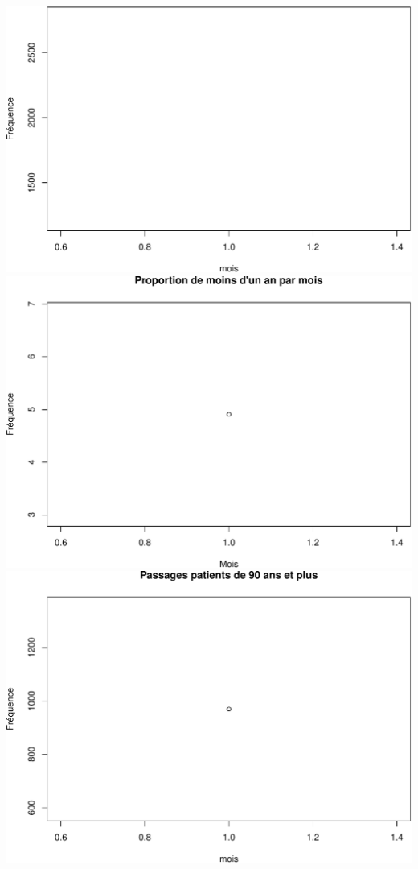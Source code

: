 \documentclass[]{article}
\begin{document}
\includegraphics{rapport_2014_files/figure-latex/age_extreme-1.pdf}
\includegraphics{rapport_2014_files/figure-latex/age_extreme-2.pdf}
\includegraphics{rapport_2014_files/figure-latex/age_extreme-3.pdf}
\end{document}
